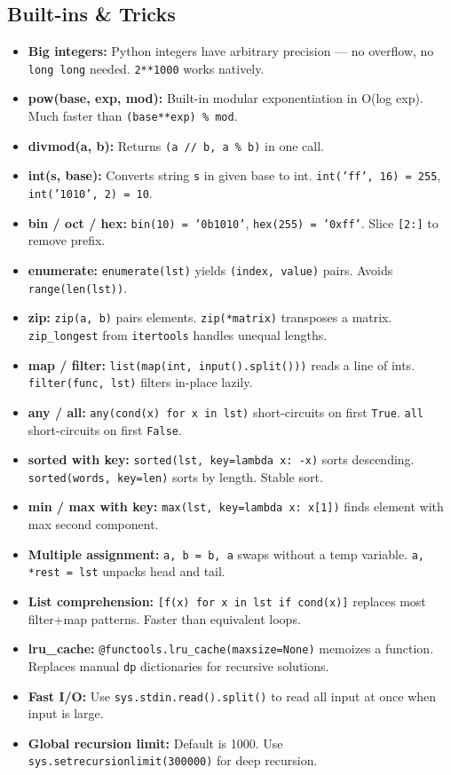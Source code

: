 \subsection{Built-ins \& Tricks}

\begin{itemize}
    \item \textbf{Big integers: } Python integers have arbitrary precision — no overflow, no \texttt{long long} needed. \texttt{2**1000} works natively.
    \item \textbf{pow(base, exp, mod): } Built-in modular exponentiation in O(log exp). Much faster than \texttt{(base**exp) \% mod}.
    \item \textbf{divmod(a, b): } Returns \texttt{(a // b, a \% b)} in one call.
    \item \textbf{int(s, base): } Converts string \texttt{s} in given base to int. \texttt{int('ff', 16) = 255}, \texttt{int('1010', 2) = 10}.
    \item \textbf{bin / oct / hex: } \texttt{bin(10) = '0b1010'}, \texttt{hex(255) = '0xff'}. Slice \texttt{[2:]} to remove prefix.
    \item \textbf{enumerate: } \texttt{enumerate(lst)} yields \texttt{(index, value)} pairs. Avoids \texttt{range(len(lst))}.
    \item \textbf{zip: } \texttt{zip(a, b)} pairs elements. \texttt{zip(*matrix)} transposes a matrix. \texttt{zip\_longest} from \texttt{itertools} handles unequal lengths.
    \item \textbf{map / filter: } \texttt{list(map(int, input().split()))} reads a line of ints. \texttt{filter(func, lst)} filters in-place lazily.
    \item \textbf{any / all: } \texttt{any(cond(x) for x in lst)} short-circuits on first \texttt{True}. \texttt{all} short-circuits on first \texttt{False}.
    \item \textbf{sorted with key: } \texttt{sorted(lst, key=lambda x: -x)} sorts descending. \texttt{sorted(words, key=len)} sorts by length. Stable sort.
    \item \textbf{min / max with key: } \texttt{max(lst, key=lambda x: x[1])} finds element with max second component.
    \item \textbf{Multiple assignment: } \texttt{a, b = b, a} swaps without a temp variable. \texttt{a, *rest = lst} unpacks head and tail.
    \item \textbf{List comprehension: } \texttt{[f(x) for x in lst if cond(x)]} replaces most filter+map patterns. Faster than equivalent loops.
    \item \textbf{lru\_cache: } \texttt{@functools.lru\_cache(maxsize=None)} memoizes a function. Replaces manual \texttt{dp} dictionaries for recursive solutions.
    \item \textbf{Fast I/O: } Use \texttt{sys.stdin.read().split()} to read all input at once when input is large.
    \item \textbf{Global recursion limit: } Default is 1000. Use \texttt{sys.setrecursionlimit(300000)} for deep recursion.
\end{itemize}

